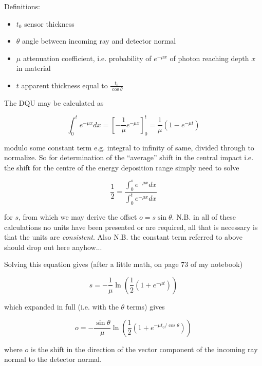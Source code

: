 \documentclass{article}
\begin{document}
\noindent
Definitions:
\begin{itemize}
\item{$t_0$ sensor thickness}
\item{$\theta$ angle between incoming ray and detector normal}
\item{$\mu$ attenuation coefficient, i.e. probability of $e^{-\mu x}$ of photon reaching depth $x$ in material}
\item{$t$ apparent thickness equal to $\frac{t_0}{\cos \theta}$}
\end{itemize}

\noindent
The DQU may be calculated as

\begin{equation}
\int_0^t e^{-\mu x} dx = \left[ - \frac{1}{\mu} e^{-\mu x} \right]_0^t = 
\frac{1}{\mu} \left( 1 - e^{-\mu t} \right)
\end{equation}

\noindent
modulo some constant term e.g. integral to infinity of same, divided
through to normalize.
So for determination of the ``average'' shift in the central impact i.e. the shift for the centre of the energy deposition range simply need to solve 

\begin{equation}
\frac{1}{2} = \frac{\int_0^s e^{-\mu x} dx}{\int_0^t e^{-\mu x} dx}
\end{equation}

\noindent
for $s$, from which we may derive the offset $o = s \sin
\theta$. N.B. in all of these calculations no units have been
presented or are required, all that is necessary is that the units are
\emph{consistent}. Also N.B. the constant term referred to above
should drop out here anyhow...

Solving this equation gives (after a little math, on page 73 of my notebook)

\begin{equation}
s = - \frac{1}{\mu} \ln \left( \frac{1}{2} \left( 1 + e^{-\mu t} \right) \right)
\end{equation}

\noindent
which expanded in full (i.e. with the $\theta$ terms) gives

\begin{equation}
o = - \frac{\sin \theta}{\mu} \ln \left( \frac{1}{2} \left( 1 + e^{-\mu t_0 / \cos \theta} \right) \right)
\end{equation}

\noindent
where $o$ is the shift in the direction of the vector component of the incoming ray normal to the detector normal.
\end{document}
